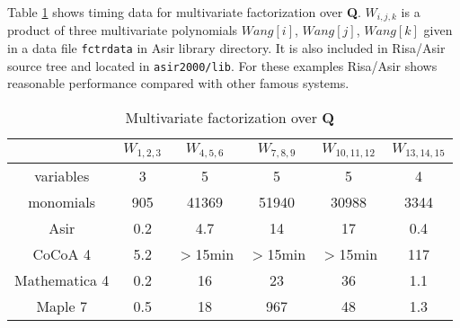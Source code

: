 \documentclass[runningheads]{cl2emult}
\begin{document}
%

Table \ref{multifac} shows timing data for multivariate
factorization over {\bf Q}.
$W_{i,j,k}$ is a product of three multivariate polynomials 
$Wang[i]$, $Wang[j]$, $Wang[k]$ given in a data file
{\tt fctrdata} in Asir library directory. It is also included
in Risa/Asir source tree and located in {\tt asir2000/lib}.
For these examples Risa/Asir shows reasonable performance
compared with other famous systems. 

\begin{table}[hbtp]
\begin{center}
\begin{tabular}{|c||c|c|c|c|c|} \hline
	& $W_{1,2,3}$ & $W_{4,5,6}$ & $W_{7,8,9}$ & $W_{10,11,12}$ & $W_{13,14,15}$ \\ \hline
variables & 3 & 5 & 5 & 5 & 4 \\ \hline
monomials & 905 & 41369 & 51940 & 30988 & 3344 \\ \hline\hline
Asir 	& 0.2 & 4.7 & 14 & 17 & 0.4 \\ \hline
CoCoA 4 & 5.2 & $>$15min 	& $>$15min & $>$15min & 117 \\ \hline\hline
Mathematica 4& 0.2 	& 16 	& 23 & 36 & 1.1 \\ \hline
Maple 7& 0.5 	& 18 	& 967  & 48 & 1.3 \\ \hline
\end{tabular}
\end{center}
\caption{Multivariate factorization over {\bf Q}}
\label{multifac}
\end{table}
\end{document}
